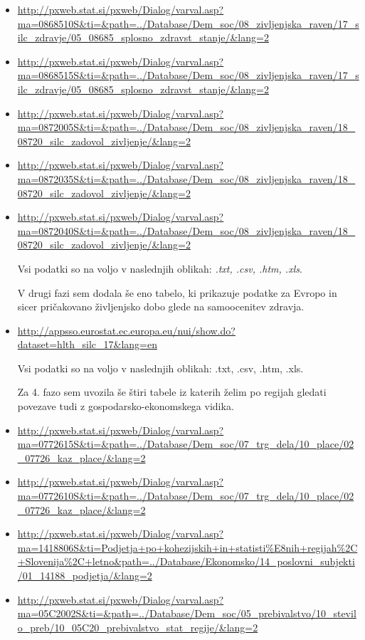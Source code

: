 \documentclass[11pt,a4paper]{article}
\begin{document}
\begin{itemize} 
\item \url{http://pxweb.stat.si/pxweb/Dialog/varval.asp?ma=0868510S\&ti=\&path=../Database/Dem\_soc/08\_zivljenjska\_raven/17\_silc\_zdravje/05\_08685\_splosno\_zdravst\_stanje/\&lang=2}

\item  \url{http://pxweb.stat.si/pxweb/Dialog/varval.asp?ma=0868515S\&ti=\&path=../Database/Dem\_soc/08\_zivljenjska\_raven/17\_silc\_zdravje/05\_08685\_splosno\_zdravst\_stanje/\&lang=2}

\item \url{http://pxweb.stat.si/pxweb/Dialog/varval.asp?ma=0872005S\&ti=\&path=../Database/Dem\_soc/08\_zivljenjska\_raven/18\_08720\_silc\_zadovol\_zivljenje/\&lang=2}

\item \url{http://pxweb.stat.si/pxweb/Dialog/varval.asp?ma=0872035S\&ti=\&path=../Database/Dem\_soc/08\_zivljenjska\_raven/18\_08720\_silc\_zadovol\_zivljenje/\&lang=2}

\item  \url{http://pxweb.stat.si/pxweb/Dialog/varval.asp?ma=0872040S\&ti=\&path=../Database/Dem\_soc/08\_zivljenjska\_raven/18\_08720\_silc\_zadovol\_zivljenje/\&lang=2}

Vsi podatki so na voljo v naslednjih oblikah: \textit{.txt, .csv, .htm, .xls}.

V drugi fazi sem dodala še eno tabelo, ki prikazuje podatke za Evropo in sicer pričakovano življenjsko dobo glede na samoocenitev zdravja. 
\item
\url{ http://appsso.eurostat.ec.europa.eu/nui/show.do?dataset=hlth_silc_17&lang=en}

Vsi podatki so na voljo v naslednjih oblikah: .txt, .csv, .htm, .xls.

Za 4. fazo sem uvozila še štiri tabele iz katerih želim po regijah gledati povezave tudi z gospodarsko-ekonomskega vidika.

\item
\url{http://pxweb.stat.si/pxweb/Dialog/varval.asp?ma=0772615S&ti=&path=../Database/Dem_soc/07_trg_dela/10_place/02_07726_kaz_place/&lang=2}

\item
\url{http://pxweb.stat.si/pxweb/Dialog/varval.asp?ma=0772610S&ti=&path=../Database/Dem_soc/07_trg_dela/10_place/02_07726_kaz_place/&lang=2}

\item
\url{http://pxweb.stat.si/pxweb/Dialog/varval.asp?ma=1418806S&ti=Podjetja+po+kohezijskih+in+statisti%E8nih+regijah%2C+Slovenija%2C+letno&path=../Database/Ekonomsko/14_poslovni_subjekti/01_14188_podjetja/&lang=2}

\item
\url{http://pxweb.stat.si/pxweb/Dialog/varval.asp?ma=05C2002S&ti=&path=../Database/Dem_soc/05_prebivalstvo/10_stevilo_preb/10_05C20_prebivalstvo_stat_regije/&lang=2}
\end{itemize}
\end{document}
